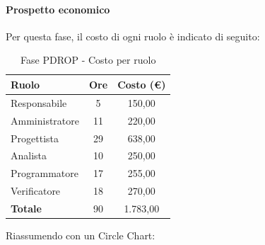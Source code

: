 \documentclass[../PianoProgetto.tex]{subfiles}
\begin{document}
	\paragraph{Prospetto economico}
					Per questa fase, il costo di ogni ruolo è indicato di seguito:
	\begin{table}[h]
		\centering
	
		\begin{tabular}{l * {2}{c}}
			\toprule
			\textbf{Ruolo} & \textbf{Ore} & \textbf{Costo (\euro{})} \\
			\midrule
			Responsabile &	5 & 150,00 \\
			Amministratore & 11 & 220,00 \\
			Progettista & 29 & 638,00 \\
			Analista & 10 & 250,00 \\
			Programmatore & 17 & 255,00 \\
			Verificatore & 18 & 270,00 \\
			\midrule		
			\textbf{Totale} & 90 & 1.783,00 \\
			\bottomrule
		\end{tabular}
		\caption{Fase PDROP - Costo per ruolo}
		\label{tab:fasePDROP_costo}
	\end{table}
\vfill	
\newpage
\vfill	
	Riassumendo con un Circle Chart:
\end{document}
